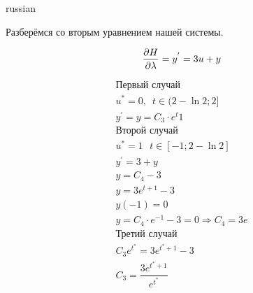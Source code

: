 \documentclass{article}
\begin{document}
\begin{otherlanguage*}{russian}
\begin{enumerate}
Разберёмся со вторым уравнением нашей системы. 

$$ \dfrac{\partial H}{\partial \lambda} = y ^{'} = 3 u + y \\$$


\begin{align*}
\text{Первый случай }\\
u^* = 0, \,\,\,  t \in (2 - \ln 2 ; 2 ] \\
y^{'} = y = C_3 \cdot e ^ t 1 \\
\text{Второй случай}\\
u^*  = 1 \,\,\,\, t \in [-1; 2 - \ln 2 ] \\
y^{'} = 3 + y \\
y = C_4 - 3 \\
y = 3 e^{t+1} - 3 \\
y(-1) = 0 \\
y = C_4 \cdot e ^{-1} - 3 = 0 \Rightarrow C_4 = 3 e \\
\text{Третий случай} \\
C_3 e^{t^*} = 3 e^{t^* + 1} - 3 \\
C_3 = \dfrac{3 e ^{t^* + 1}}{e^{t^*}}
\end{align*}


\end{enumerate}
\end{otherlanguage*}
\end{document}
